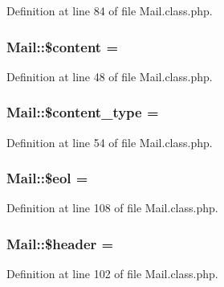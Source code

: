 Definition at line 84 of file Mail.\+class.\+php.

\subsubsection[{\texorpdfstring{\$content}{$content}}]{\setlength{\rightskip}{0pt plus 5cm}Mail\+::\$content = \textquotesingle{}\textquotesingle{}}\hypertarget{classMail_a5a3320973718a2ca8a3fe798bf79c624}{}\label{classMail_a5a3320973718a2ca8a3fe798bf79c624}


Definition at line 48 of file Mail.\+class.\+php.

\subsubsection[{\texorpdfstring{\$content\+\_\+type}{$content_type}}]{\setlength{\rightskip}{0pt plus 5cm}Mail\+::\$content\+\_\+type = \textquotesingle{}}\hypertarget{classMail_ac933733b17efbb4978a46e557d32c440}{}\label{classMail_ac933733b17efbb4978a46e557d32c440}


Definition at line 54 of file Mail.\+class.\+php.

\subsubsection[{\texorpdfstring{\$eol}{$eol}}]{\setlength{\rightskip}{0pt plus 5cm}Mail\+::\$eol = \textquotesingle{}\textquotesingle{}}\hypertarget{classMail_acaebf19cba0b8be83989e241c96f9eb7}{}\label{classMail_acaebf19cba0b8be83989e241c96f9eb7}


Definition at line 108 of file Mail.\+class.\+php.

\subsubsection[{\texorpdfstring{\$header}{$header}}]{\setlength{\rightskip}{0pt plus 5cm}Mail\+::\$header = \textquotesingle{}\textquotesingle{}}\hypertarget{classMail_ace98431d0944d23544743094b443d506}{}\label{classMail_ace98431d0944d23544743094b443d506}


Definition at line 102 of file Mail.\+class.\+php.

